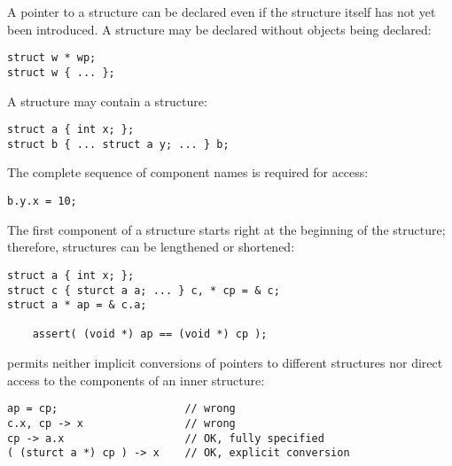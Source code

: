A pointer to a structure can be declared even if the structure itself has
not yet been introduced. A structure may be declared without objects being
declared:
\begin{lstlisting}
struct w * wp;
struct w { ... };
\end{lstlisting}
A structure may contain a structure:
\begin{lstlisting}
struct a { int x; };
struct b { ... struct a y; ... } b;
\end{lstlisting}
The complete sequence of component names is required for access:
\begin{lstlisting}
b.y.x = 10;
\end{lstlisting}
The first component of a structure starts right at the beginning of the
structure; therefore, structures can be lengthened or shortened:
\begin{lstlisting}
struct a { int x; };
struct c { sturct a a; ... } c, * cp = & c;
struct a * ap = & c.a;

	assert( (void *) ap == (void *) cp );
\end{lstlisting}
 permits neither implicit conversions of pointers to different
structures nor direct access to the components of an inner structure:
\begin{lstlisting}
ap = cp;					// wrong
c.x, cp -> x				// wrong
cp -> a.x					// OK, fully specified
( (sturct a *) cp ) -> x	// OK, explicit conversion
\end{lstlisting}

